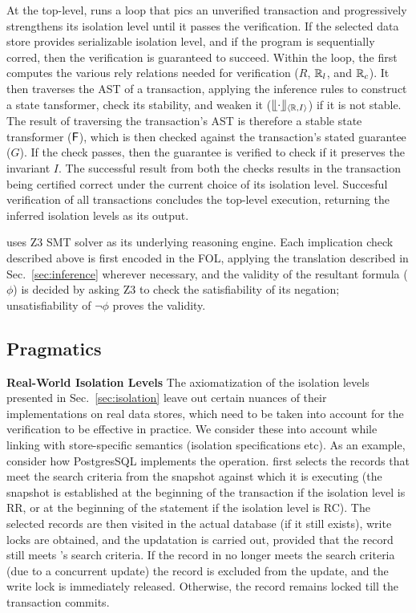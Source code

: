 At the top-level, \tool runs a loop that pics an unverified
transaction and progressively strengthens its isolation level until it
passes the verification. If the selected data store provides
serializable isolation level, and if the program is sequentially
corred, then the verification is guaranteed to succeed. Within the
loop, the \tool first computes the various rely relations needed for
verification ($R$, $\mathbb{R}_l$, and $\mathbb{R}_c$). It then traverses the AST of a
transaction, applying the inference rules to construct a state
tansformer, check its stability, and weaken it ($\llfloor \cdot \rrfloor_{\langle \mathbb{R},I \rangle}$)
if it is not stable. The result of traversing the transaction's AST is
therefore a stable state transformer (${\sf F}$), which is then checked
against the transaction's stated guarantee ($G$). If the check passes,
then the guarantee is verified to check if it preserves the invariant
$I$. The successful result from both the checks results in the
transaction being certified correct under the current choice of its
isolation level. Succesful verification of all transactions concludes
the top-level execution, returning the inferred isolation levels as
its output.

\tool uses Z3 SMT solver as its underlying reasoning engine. Each
implication check described above is first encoded in the FOL,
applying the translation described in Sec.~\ref{sec:inference}
wherever necessary, and the validity of the resultant formula ($\phi$)
is decided by asking Z3 to check the satisfiability of its negation;
unsatisfiability of $\neg\phi$ proves the validity.

\subsection{Pragmatics}

\textbf{Real-World Isolation Levels} The axiomatization of the
isolation levels presented in Sec.~\ref{sec:isolation} leave out
certain nuances of their implementations on real data stores, which
need to be taken into account for the verification to be effective in
practice.  We consider these into account while linking \tool with
store-specific semantics (isolation specifications etc). As an
example, consider how PostgresSQL implements the  operation.
 first selects the records that meet the search criteria
from the snapshot against which it is executing (the snapshot is
established at the beginning of the transaction if the isolation level
is RR, or at the beginning of the  statement if the
isolation level is RC). The selected records are then visited in the
actual database (if it still exists), write locks are obtained, and
the updatation is carried out, provided that the record still meets
's search criteria. If the record in no longer meets the
search criteria (due to a concurrent update) the record is excluded
from the update, and the write lock is immediately released.
Otherwise, the record remains locked till the transaction commits. 

